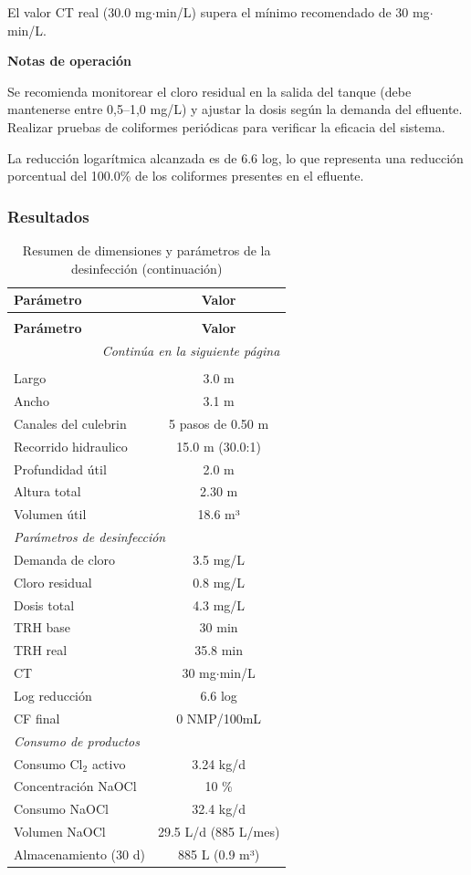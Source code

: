 \documentclass[12pt,a4paper]{article}
\begin{document}
El valor CT real (30.0 mg$⋅$min/L) supera el mínimo recomendado de 30 mg$⋅$min/L.


\textbf{Notas de operación}

Se recomienda monitorear el cloro residual en la salida del tanque (debe mantenerse entre 0,5--1,0 mg/L) y ajustar la dosis según la demanda del efluente. Realizar pruebas de coliformes periódicas para verificar la eficacia del sistema.

La reducción logarítmica alcanzada es de 6.6 log, lo que representa una reducción porcentual del 100.0\% de los coliformes presentes en el efluente.

\subsubsection{Resultados}

\begingroup
\small
\begin{longtable}{@{}lc@{}}
\caption{Resumen de dimensiones y parámetros de la desinfección}\\
\toprule
\textbf{Parámetro} & \textbf{Valor} \\
\midrule
\endfirsthead
\caption[]{Resumen de dimensiones y parámetros de la desinfección (continuación)}\\
\toprule
\textbf{Parámetro} & \textbf{Valor} \\
\midrule
\endhead
\midrule
\multicolumn{2}{r}{\textit{Continúa en la siguiente página}} \\
\endfoot
\bottomrule
\endlastfoot
\multicolumn{2}{l}{\textit{Dimensiones del tanque}} \\
\midrule
Largo & 3.0 m \\
Ancho & 3.1 m \\
Canales del culebrin & 5 pasos de 0.50 m \\
Recorrido hidraulico & 15.0 m (30.0:1) \\
Profundidad útil & 2.0 m \\
Altura total & 2.30 m \\
Volumen útil & 18.6 m³ \\
\midrule
\multicolumn{2}{l}{\textit{Parámetros de desinfección}} \\
\midrule
Demanda de cloro & 3.5 mg/L \\
Cloro residual & 0.8 mg/L \\
Dosis total & 4.3 mg/L \\
TRH base & 30 min \\
TRH real & 35.8 min \\
CT & 30 mg$\cdot$min/L \\
Log reducción & 6.6 log \\
CF final & 0 NMP/100mL \\
\midrule
\multicolumn{2}{l}{\textit{Consumo de productos}} \\
\midrule
Consumo Cl$_2$ activo & 3.24 kg/d \\
Concentración NaOCl & 10 \% \\
Consumo NaOCl & 32.4 kg/d \\
Volumen NaOCl & 29.5 L/d (885 L/mes) \\
Almacenamiento (30 d) & 885 L (0.9 m³) \\
\end{longtable}
\endgroup
\end{document}
